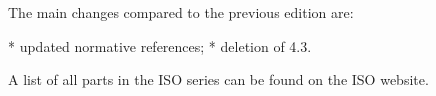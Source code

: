 The main changes compared to the previous edition are:

* updated normative references;
* deletion of 4.3.

A list of all parts in the ISO  series can be found on the ISO website.


